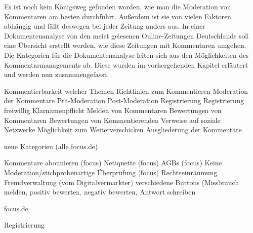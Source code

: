 

Es ist noch kein Königsweg gefunden worden, wie man die Moderation von Kommentaren am besten durchführt. Außerdem ist sie von vielen Faktoren abhängig und fällt deswegen bei jeder Zeitung anders aus. In einer Dokumentenanalyse von den meist gelesenen Online-Zeitungen Deutschlands soll eine Übersicht erstellt werden, wie diese Zeitungen mit Kommentaren umgehen. Die Kategorien für die Dokumentenanalyse leiten sich aus den Möglichkeiten des Kommentarmanagements ab. Diese wurden im vorhergehenden Kapitel erläutert und werden nun zusammengefasst. 

Kommentierbarkeit welcher Themen
Richtlinien zum Kommentieren 
Moderation der Kommentare
Prä-Moderation
Post-Moderation
Registrierung
Registrierung freiwillig
Klarnamenpflicht
Melden von Kommentaren
Bewertungen von Kommentaren
Bewertungen von Kommentierenden
Verweise  auf soziale Netzwerke
Möglichkeit zum Weiterverschicken
Ausgliederung der Kommentare






neue Kategorien (alle focus.de)

Kommentare abonnieren (focus)
Netiquette (focus)
AGBs (focus)
Keine Moderation/stichprobenartige Überprüfung (focus)
Rechteeinräumung
Fremdverwaltung (vom Digitalvermarkter)
verschiedene Buttons (Missbrauch melden, positiv bewerten, negativ bewerten, Antwort schreiben

focus.de

Registrierung
